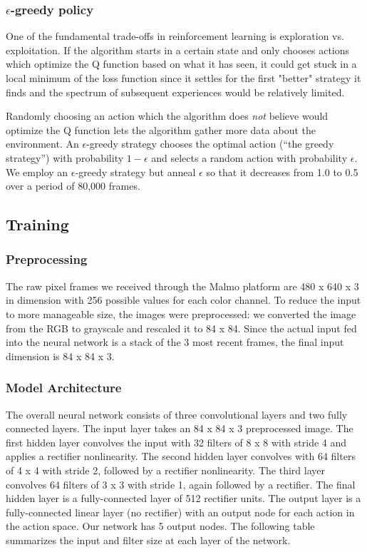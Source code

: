\documentclass{article}
\begin{document}
\begin{multicols}{2}
\subsubsection{$\epsilon$-greedy policy}

One of the fundamental trade-offs in reinforcement learning is exploration vs. exploitation. If the algorithm starts in a certain state and only chooses actions which optimize the Q function based on what it has seen, it could get stuck in a local minimum of the loss function since it settles for the first "better" strategy it finds and the spectrum of subsequent experiences would be relatively limited.

Randomly choosing an action which the algorithm does \emph{not} believe would optimize the Q function lets the algorithm gather more data about the environment. An $\epsilon$-greedy strategy chooses the optimal action (``the greedy strategy'') with probability $1-\epsilon$ and selects a random action with probability $\epsilon$.
We employ an $\epsilon$-greedy strategy but anneal $\epsilon$ so that it decreases from 1.0 to 0.5 over a period of 80,000 frames.


\subsection{Training}

\subsubsection{Preprocessing}

The raw pixel frames we received through the Malmo platform are 480 x 640 x 3 in dimension with 256 possible values for each color channel. To reduce the input to more manageable size, the images were preprocessed: we converted the image from the RGB to grayscale and rescaled it to 84 x 84. Since the actual input fed into the neural network is a stack of the 3 most recent frames, the final input dimension is 84 x 84 x 3.

\subsubsection{Model Architecture}

The overall neural network consists of three convolutional layers and two fully connected layers. The input layer takes an 84 x 84 x 3 preprocessed image. The first hidden layer convolves the input with 32 filters of 8 x 8 with stride 4 and applies a rectifier nonlinearity. The second hidden layer convolves with 64 filters of 4 x 4 with stride 2, followed by a rectifier nonlinearity. The third layer convolves 64 filters of 3 x 3 with stride 1, again followed by a rectifier. The final hidden layer is a fully-connected layer of 512 rectifier units. The output layer is a fully-connected linear layer (no rectifier) with an output node for each action in the action space. Our network has 5 output nodes. The following table summarizes the input and filter size at each layer of the network.
\newline


\end{multicols}
\end{document}
